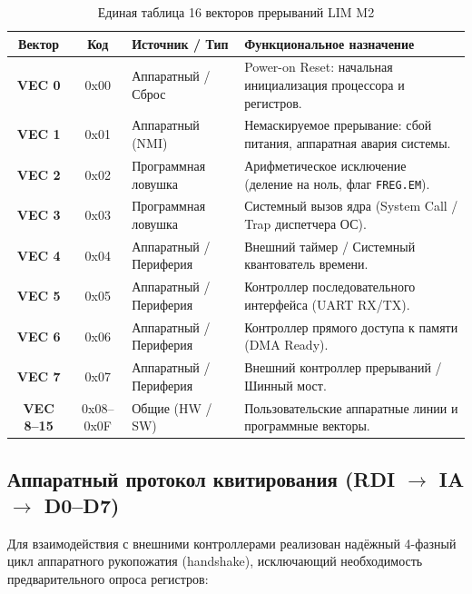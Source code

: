 \documentclass[11pt,a4paper]{article}
\newcommand{\reg}[1]{\texttt{#1}}
\begin{document}
\begin{table}[h]
\centering
\caption{Единая таблица 16 векторов прерываний LIM M2}
\label{tab:vectors}
\begin{tabularx}{\textwidth}{>{\bfseries}c >{\ttfamily}c p{32mm}X}
\toprule
Вектор & Код & Источник / Тип & Функциональное назначение \\
\midrule
VEC 0  & 0x00 & Аппаратный / Сброс & Power-on Reset: начальная инициализация процессора и регистров. \\
VEC 1  & 0x01 & Аппаратный (NMI)   & Немаскируемое прерывание: сбой питания, аппаратная авария системы. \\
VEC 2  & 0x02 & Программная ловушка & Арифметическое исключение (деление на ноль, флаг \reg{FREG.EM}). \\
VEC 3  & 0x03 & Программная ловушка & Системный вызов ядра (System Call / Trap диспетчера ОС). \\
VEC 4  & 0x04 & Аппаратный / Периферия & Внешний таймер / Системный квантователь времени. \\
VEC 5  & 0x05 & Аппаратный / Периферия & Контроллер последовательного интерфейса (UART RX/TX). \\
VEC 6  & 0x06 & Аппаратный / Периферия & Контроллер прямого доступа к памяти (DMA Ready). \\
VEC 7  & 0x07 & Аппаратный / Периферия & Внешний контроллер прерываний / Шинный мост. \\
VEC 8--15 & 0x08--0x0F & Общие (HW / SW) & Пользовательские аппаратные линии и программные векторы. \\
\bottomrule
\end{tabularx}
\end{table}

\subsection{Аппаратный протокол квитирования (RDI $\to$ IA $\to$ D0--D7)}
Для взаимодействия с внешними контроллерами реализован надёжный 4-фазный цикл аппаратного рукопожатия (handshake), исключающий необходимость предварительного опроса регистров:
\end{document}
